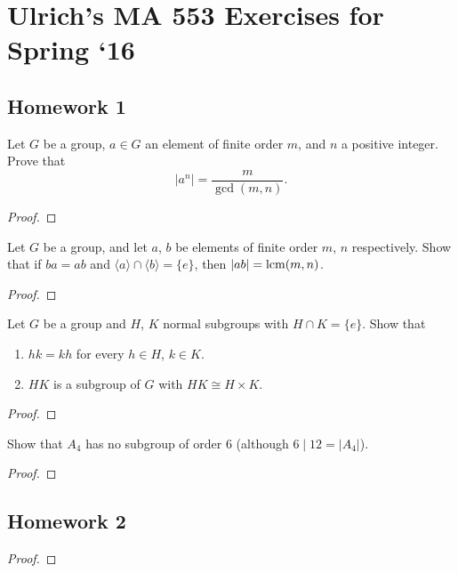 \chapter{Ulrich's MA 553 Exercises for Spring `16}
\section{Homework 1}
\begin{exercise}
Let $G$ be a group, $a\in G$ an element of finite order $m$, and $n$ a
positive integer. Prove that
\[
|a^n|=\frac{m}{\gcd(m,n)}.
\]
\end{exercise}
\begin{proof}

\end{proof}

\begin{exercise}
Let $G$ be a group, and let $a$, $b$ be elements of finite order $m$, $n$
respectively. Show that if $ba=ab$ and $\langle a\rangle\cap\langle
b\rangle=\{e\}$, then $|ab|=\operatorname{lcm}(m,n)$.
\end{exercise}
\begin{proof}
\end{proof}

\begin{exercise}
Let $G$ be a group and $H$, $K$ normal subgroups with $H\cap K=\{e\}$. Show
that
\begin{enumerate}[label=(\alph*)]
\item $hk=kh$ for every $h\in H$, $k\in K$.
\item $HK$ is a subgroup of $G$ with $HK\cong H\times K$.
\end{enumerate}
\end{exercise}
\begin{proof}
\end{proof}

\begin{exercise}
Show that $A_4$ has no subgroup of order $6$ (although $6\mid 12=|A_4|$).
\end{exercise}
\begin{proof}
\end{proof}

\section{Homework 2}
\begin{exercise}
\end{exercise}
\begin{proof}
\end{proof}

